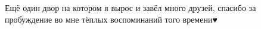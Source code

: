  
 
 
 
 

\qqSecCmt


Ещё один двор на котором я вырос и завёл много друзей, спасибо за пробуждение
во мне тёплых воспоминаний того времени♥︎

